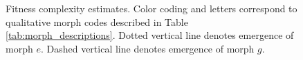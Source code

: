 \begin{figure}


% 
% 

\caption{ Fitness complexity estimates. Color coding and letters correspond to qualitative morph codes described in Table \ref{tab:morph_descriptions}. 
Dotted vertical line denotes emergence of morph $e$.
Dashed vertical line denotes emergence of morph $g$.
}
\label{fig:fitness_complexity}

\end{figure}